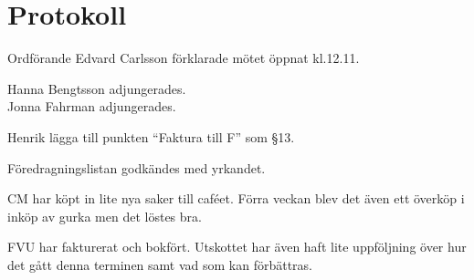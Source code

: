 \documentclass[10pt]{article}
\def\mo{Edvard Carlsson}
\begin{document}
\section*{Protokoll}
\begin{paragrafer}
Ordförande {\mo} förklarade mötet öppnat kl.12.11.

{\valavmo}

{\valavms}

{\valavj}

{\tosg}

Hanna Bengtsson adjungerades. \\
Jonna Fahrman adjungerades.





Henrik \ypa lägga till punkten ``Faktura till F'' som §13.

Föredragningslistan godkändes med yrkandet.


\begin{fyllnadsval} %
\end{fyllnadsval}

\begin{paragrafer}

CM har köpt in lite nya saker till caféet. Förra veckan blev det även ett överköp i inköp av gurka men det löstes bra.

FVU har fakturerat och bokfört. Utskottet har även haft lite uppföljning över hur det gått denna terminen samt vad som kan förbättras.


\end{paragrafer}
\end{paragrafer}
\end{document}

